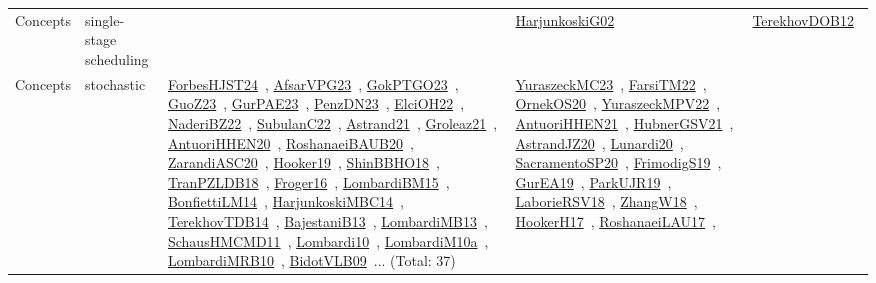 {\begin{longtable}{lp{3cm}>{\raggedright\arraybackslash}p{6cm}>{\raggedright\arraybackslash}p{6cm}>{\raggedright\arraybackslash}p{8cm}}
Concepts & single-stage scheduling &  & \href{../works/HarjunkoskiG02.pdf}{HarjunkoskiG02}~\cite{HarjunkoskiG02} & \href{../works/TerekhovDOB12.pdf}{TerekhovDOB12}~\cite{TerekhovDOB12}\\
Concepts & stochastic & \href{../works/ForbesHJST24.pdf}{ForbesHJST24}~\cite{ForbesHJST24}, \href{../works/AfsarVPG23.pdf}{AfsarVPG23}~\cite{AfsarVPG23}, \href{../works/GokPTGO23.pdf}{GokPTGO23}~\cite{GokPTGO23}, \href{../works/GuoZ23.pdf}{GuoZ23}~\cite{GuoZ23}, \href{../works/GurPAE23.pdf}{GurPAE23}~\cite{GurPAE23}, \href{../works/PenzDN23.pdf}{PenzDN23}~\cite{PenzDN23}, \href{../works/ElciOH22.pdf}{ElciOH22}~\cite{ElciOH22}, \href{../works/NaderiBZ22.pdf}{NaderiBZ22}~\cite{NaderiBZ22}, \href{../works/SubulanC22.pdf}{SubulanC22}~\cite{SubulanC22}, \href{../works/Astrand21.pdf}{Astrand21}~\cite{Astrand21}, \href{../works/Groleaz21.pdf}{Groleaz21}~\cite{Groleaz21}, \href{../works/AntuoriHHEN20.pdf}{AntuoriHHEN20}~\cite{AntuoriHHEN20}, \href{../works/RoshanaeiBAUB20.pdf}{RoshanaeiBAUB20}~\cite{RoshanaeiBAUB20}, \href{../works/ZarandiASC20.pdf}{ZarandiASC20}~\cite{ZarandiASC20}, \href{../works/Hooker19.pdf}{Hooker19}~\cite{Hooker19}, \href{../works/ShinBBHO18.pdf}{ShinBBHO18}~\cite{ShinBBHO18}, \href{../works/TranPZLDB18.pdf}{TranPZLDB18}~\cite{TranPZLDB18}, \href{../works/Froger16.pdf}{Froger16}~\cite{Froger16}, \href{../works/LombardiBM15.pdf}{LombardiBM15}~\cite{LombardiBM15}, \href{../works/BonfiettiLM14.pdf}{BonfiettiLM14}~\cite{BonfiettiLM14}, \href{../works/HarjunkoskiMBC14.pdf}{HarjunkoskiMBC14}~\cite{HarjunkoskiMBC14}, \href{../works/TerekhovTDB14.pdf}{TerekhovTDB14}~\cite{TerekhovTDB14}, \href{../works/BajestaniB13.pdf}{BajestaniB13}~\cite{BajestaniB13}, \href{../works/LombardiMB13.pdf}{LombardiMB13}~\cite{LombardiMB13}, \href{../works/SchausHMCMD11.pdf}{SchausHMCMD11}~\cite{SchausHMCMD11}, \href{../works/Lombardi10.pdf}{Lombardi10}~\cite{Lombardi10}, \href{../works/LombardiM10a.pdf}{LombardiM10a}~\cite{LombardiM10a}, \href{../works/LombardiMRB10.pdf}{LombardiMRB10}~\cite{LombardiMRB10}, \href{../works/BidotVLB09.pdf}{BidotVLB09}~\cite{BidotVLB09}... (Total: 37) & \href{../works/YuraszeckMC23.pdf}{YuraszeckMC23}~\cite{YuraszeckMC23}, \href{../works/FarsiTM22.pdf}{FarsiTM22}~\cite{FarsiTM22}, \href{../works/OrnekOS20.pdf}{OrnekOS20}~\cite{OrnekOS20}, \href{../works/YuraszeckMPV22.pdf}{YuraszeckMPV22}~\cite{YuraszeckMPV22}, \href{../works/AntuoriHHEN21.pdf}{AntuoriHHEN21}~\cite{AntuoriHHEN21}, \href{../works/HubnerGSV21.pdf}{HubnerGSV21}~\cite{HubnerGSV21}, \href{../works/AstrandJZ20.pdf}{AstrandJZ20}~\cite{AstrandJZ20}, \href{../works/Lunardi20.pdf}{Lunardi20}~\cite{Lunardi20}, \href{../works/SacramentoSP20.pdf}{SacramentoSP20}~\cite{SacramentoSP20}, \href{../works/FrimodigS19.pdf}{FrimodigS19}~\cite{FrimodigS19}, \href{../works/GurEA19.pdf}{GurEA19}~\cite{GurEA19}, \href{../works/ParkUJR19.pdf}{ParkUJR19}~\cite{ParkUJR19}, \href{../works/LaborieRSV18.pdf}{LaborieRSV18}~\cite{LaborieRSV18}, \href{../works/ZhangW18.pdf}{ZhangW18}~\cite{ZhangW18}, \href{../works/HookerH17.pdf}{HookerH17}~\cite{HookerH17}, \href{../works/RoshanaeiLAU17.pdf}{RoshanaeiLAU17}~\cite{RoshanaeiLAU17}, 
\end{longtable}}
